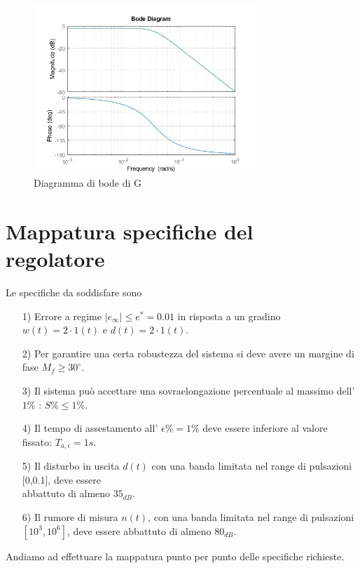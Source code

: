 \documentclass[a4paper, 11pt]{article}
\begin{document}
\begin{figure}[H]
    \centering
    \includegraphics[width=0.75\textwidth]{immagini/bode.jpg}
    \caption{Diagramma di bode di G}
    \label{fig:transform_bode}
\end{figure}

\section{Mappatura specifiche del regolatore}
\label{sec:specifications}

Le specifiche da soddisfare sono
\begin{itemize}
	\item[1)] Errore a regime $\lvert e_\infty \rvert \le e^* = 0.01$ in 
        risposta a un gradino $w(t) = 2 \cdot 1(t)$ e $d(t) = 2 \cdot 1(t)$.\\
 
	\item[2)] Per garantire una certa robustezza del sistema si deve 
        avere un margine di fase $M_f \ge 30^{\circ}$.\\

        \item[3)] Il sistema può accettare una sovraelongazione percentuale al massimo dell'$1 \%$ : $S \% \le 1 \%$.\\

        \item[4)] Il tempo di assestamento all' $\epsilon \% = 1 \%$ deve essere inferiore al valore fissato: $T_{a,\epsilon} = 1s$.\\

        \item[5)] Il disturbo in uscita $d(t)$ con una banda limitata nel range di pulsazioni [0,0.1], deve essere \\abbattuto di almeno $35_{dB}$.\\
        
	\item[6)] Il rumore di misura $n(t)$, con una banda limitata nel 
        range di pulsazioni $[10^3,10^6]$, deve essere abbattuto di almeno $80_{dB}$.\\
\end{itemize}
%
Andiamo ad effettuare la mappatura punto per punto delle specifiche richieste.
\end{document}
